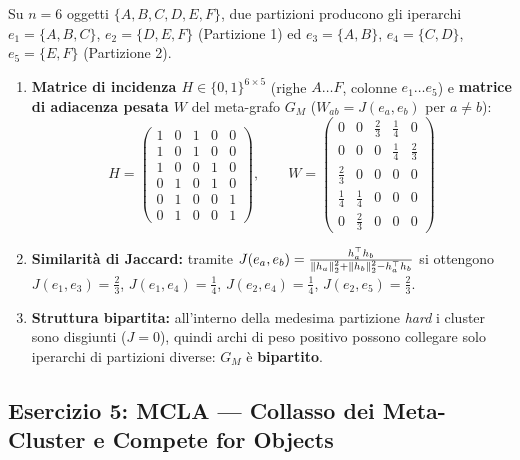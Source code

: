 Su $n = 6$ oggetti $\{A, B, C, D, E, F\}$, due partizioni producono gli iperarchi $e_1 = \{A,B,C\}$, $e_2 = \{D,E,F\}$ (Partizione 1) ed $e_3 = \{A,B\}$, $e_4 = \{C,D\}$, $e_5 = \{E,F\}$ (Partizione 2).

\begin{enumerate}
    \item \textbf{Matrice di incidenza $H \in \{0,1\}^{6 \times 5}$} (righe $A \dots F$, colonne $e_1 \dots e_5$) e \textbf{matrice di adiacenza pesata $W$} del meta-grafo $G_M$ ($W_{ab} = J(e_a, e_b)$ per $a \neq b$):
    \begin{equation*}
        H = \begin{pmatrix}
        1 & 0 & 1 & 0 & 0 \\
        1 & 0 & 1 & 0 & 0 \\
        1 & 0 & 0 & 1 & 0 \\
        0 & 1 & 0 & 1 & 0 \\
        0 & 1 & 0 & 0 & 1 \\
        0 & 1 & 0 & 0 & 1
        \end{pmatrix}, \qquad
        W = \begin{pmatrix}
        0 & 0 & \frac{2}{3} & \frac{1}{4} & 0 \\
        0 & 0 & 0 & \frac{1}{4} & \frac{2}{3} \\
        \frac{2}{3} & 0 & 0 & 0 & 0 \\
        \frac{1}{4} & \frac{1}{4} & 0 & 0 & 0 \\
        0 & \frac{2}{3} & 0 & 0 & 0
        \end{pmatrix}
    \end{equation*}
    \item \textbf{Similarit\`a di Jaccard:} tramite $J(e_a, e_b) = \frac{h_a^\top h_b}{\left\|h_a\right\|_2^2 + \left\|h_b\right\|_2^2 - h_a^\top h_b}$ si ottengono $J(e_1, e_3) = \frac{2}{3}$, $J(e_1, e_4) = \frac{1}{4}$, $J(e_2, e_4) = \frac{1}{4}$, $J(e_2, e_5) = \frac{2}{3}$.
    \item \textbf{Struttura bipartita:} all'interno della medesima partizione \textit{hard} i cluster sono disgiunti ($J = 0$), quindi archi di peso positivo possono collegare solo iperarchi di partizioni diverse: $G_M$ \`e \textbf{bipartito}.
\end{enumerate}

\FloatBarrier
\subsection{Esercizio 5: MCLA --- Collasso dei Meta-Cluster e Compete for Objects}
\label{sec:dm-ex-mcla-compete}

